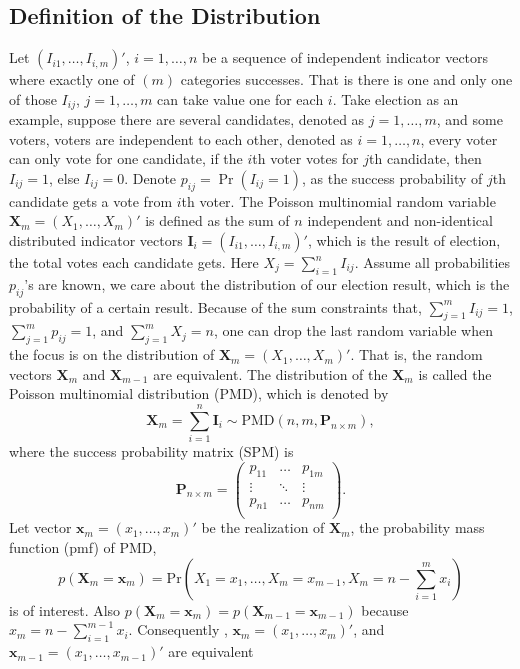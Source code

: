 \documentclass[12pt]{article}
\newcommand{\Pmat}{\mathbf{P}}
\newcommand{\PMD}{\textrm{PMD}}
\newcommand{\Xvec}{\boldsymbol{X}}
\newcommand{\xvec}{\boldsymbol{x}}
\begin{document}
\subsection{Definition of the Distribution}
		
Let $(I_{i1}, \ldots, I_{i,m})'$, $i = 1,\dots,n$ be a sequence of independent indicator vectors where exactly one of $(m)$ categories successes. That is there is one and only one of those $I_{ij}$, $j=1,\ldots, m$ can take value one for each $i$. Take election as an example, suppose there are several candidates, denoted as $j = 1,\dots,m$, and some voters, voters are independent to each other, denoted as $i = 1,\dots,n$, every voter can only vote for one candidate, if the $i$th voter votes for $j$th candidate, then $I_{ij} = 1$, else $I_{ij} = 0$.  Denote $p_{ij} = \Pr(I_{ij} = 1)$, as the success probability of $j$th candidate gets a vote from $i$th voter. The Poisson multinomial random variable $\Xvec_m = (X_1, \dots, X_m)' $ is defined as the sum of $n$ independent and non-identical distributed indicator vectors $\boldsymbol{I}_i = (I_{i1}, \ldots, I_{i,m})'$, which is the result of election, the total votes each candidate gets. Here $X_j=\sum_{i=1}^{n}I_{ij}$. Assume all probabilities $p_{ij}$'s are known, we care about the distribution of our election result, which is the probability of a certain result. Because of the sum constraints that, $\sum_{j=1}^{m} I_{ij}= 1$, $\sum_{j=1}^{m} p_{ij}= 1$, and $\sum_{j=1}^{m} X_{j}= n$, one can drop the last random variable when the focus is on the distribution of $\Xvec_m = (X_1, \ldots, X_m)'$. That is, the random vectors $\Xvec_m$ and $\Xvec_{m-1}$ are equivalent. The distribution of the $\Xvec_m$ is called the Poisson multinomial distribution (PMD), which is denoted by
$$\Xvec_m  = \sum_{i = 1}^n \boldsymbol{I}_i \sim \PMD(n,m,\Pmat_{n \times m}),$$
where the success probability matrix (SPM) is
\begin{equation*}
\Pmat_{n \times m} = \begin{pmatrix}
p_{11} &  \dots & p_{1m} \\
\vdots & \ddots & \vdots \\
p_{n1} &  \dots & p_{nm} \\
\end{pmatrix}.
\end{equation*}
Let vector $\xvec_m = (x_1,\dots,x_m)'$ be the realization of $\Xvec_m$, the probability mass function (pmf) of PMD,
$$p(\Xvec_m=\xvec_m) = \text{Pr} \left( X_1 = x_1, \dots, X_m = x_{m-1}, X_{m} = n-\sum_{i=1}^{m}x_i \right)$$
is of interest. Also $p(\Xvec_m=\xvec_m)=p(\Xvec_{m-1}=\xvec_{m-1})$ because $x_{m} = n-\sum_{i=1}^{m-1}x_i $. Consequently , $\xvec_m=(x_{1},\dots, x_m)'$, and $\xvec_{m-1} = (x_{1},\dots, x_{m-1})'$ are equivalent\\
\end{document}

